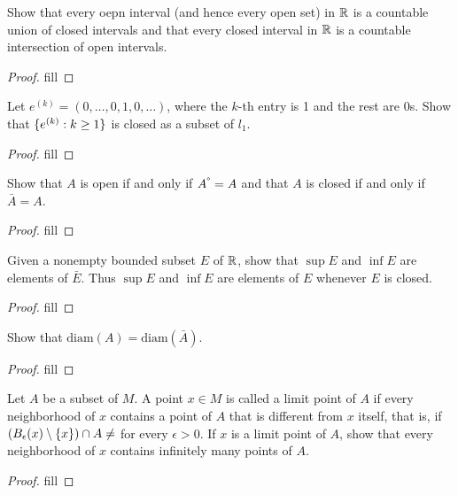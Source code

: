 \begin{exercise}{8}
Show that every oepn interval (and hence every open set) in $\R$ is a countable union of closed intervals and that every closed interval in $\R$ is a countable intersection of open intervals.
\end{exercise}
\begin{proof}
fill
\end{proof} 

\begin{exercise}{11}
Let $e^{(k)}=(0,\dots,0,1,0,\dots)$, where the $k$-th entry is 1 and the rest are 0s. Show that $\set{e^{(k)}:k\geq 1}$ is closed as a subset of $l_1$.
\end{exercise}
\begin{proof}
fill
\end{proof} 

\begin{exercise}{17}
Show that $A$ is open if and only if $A^\text{\degree}=A$ and that $A$ is closed if and only if $\bar{A}=A$.
\end{exercise}
\begin{proof}
fill
\end{proof} 

\begin{exercise}{18}
Given a nonempty bounded subset $E$ of $\R$, show that $\sup E$ and $\inf E$ are elements of $\bar{E}$. Thus $\sup E$ and $\inf E$ are elements of $E$ whenever $E$ is closed.
\end{exercise}
\begin{proof}
fill
\end{proof} 

\begin{exercise}{19}
Show that $\text{diam}(A)=\text{diam}(\bar{A})$.
\end{exercise}
\begin{proof}
fill
\end{proof} 

\begin{exercise}{33}
Let $A$ be a subset of $M$. A point $x\in M$ is called a limit point of $A$ if every neighborhood of $x$ contains a point of $A$ that is different from $x$ itself, that is, if $(B_\epsilon(x)\setminus \set{x})\cap A\neq\empty$ for every $\epsilon>0$. If $x$ is a limit point of $A$, show that every neighborhood of $x$ contains infinitely many points of $A$.
\end{exercise}
\begin{proof}
fill
\end{proof} 

